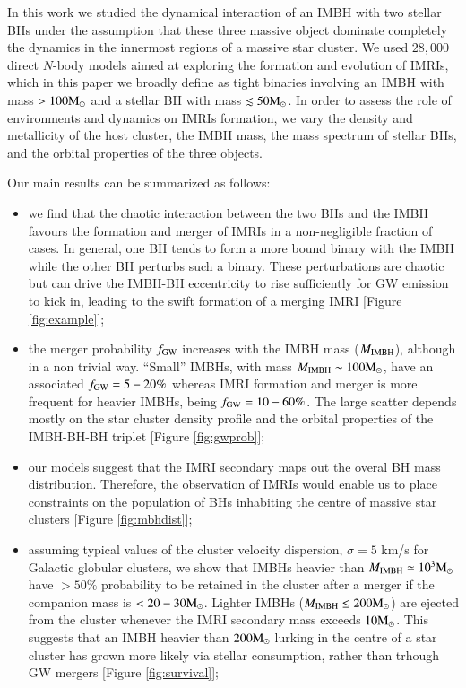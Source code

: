 \documentclass[article]{aa}
\newcommand{\Ms}{{\rm M}_\odot}
\newcommand{\gw}{{\rm GW}}
\newcommand{\ibh}{{\rm IMBH}}
\begin{document}
In this work we studied the dynamical interaction of an IMBH with two stellar BHs under the assumption
that these three massive object dominate completely the dynamics in the innermost regions of a massive star cluster.
We used $28,000$ direct $N$-body models aimed at exploring the formation and evolution of IMRIs, which in this paper we 
broadly define as tight binaries involving an IMBH with mass $> 100 \Ms$ and a stellar BH with mass $\lesssim 50 \Ms$.
In order to assess the role of environments and dynamics on IMRIs formation, we vary the density and metallicity of the 
host cluster, the IMBH mass, the mass spectrum of stellar BHs, and the orbital properties of the three objects. 

Our main results can be summarized as follows:
\begin{itemize}
\item we find that the chaotic interaction between the two BHs and the IMBH favours the formation and merger of IMRIs in a non-negligible fraction of cases. In general, one BH tends to form a more bound binary with the IMBH while the other BH perturbs such a binary. These perturbations are chaotic but can drive the IMBH-BH eccentricity to rise sufficiently for GW emission to kick in, leading to the swift formation
of a merging IMRI [Figure \ref{fig:example}];
\item the merger probability $f_\gw$ increases with the IMBH mass ($M_\ibh$), although in a non trivial way. ``Small'' IMBHs, with mass $M_\ibh \sim 100 \Ms$, have an associated $f_\gw = 5-20\%$ whereas IMRI formation and merger is more frequent for heavier IMBHs, being $f_\gw = 10-60\%$. The large scatter depends mostly on the star cluster density profile and the orbital properties of the IMBH-BH-BH triplet [Figure \ref{fig:gwprob}];
\item our models suggest that the IMRI secondary maps out the overal BH mass distribution. Therefore, the observation of IMRIs would enable us to place constraints on the population of BHs inhabiting the centre of massive star clusters [Figure \ref{fig:mbhdist}];
\item assuming typical values of the cluster velocity dispersion, $\sigma = 5$ km/s for Galactic globular clusters, we show that IMBHs heavier than $M_\ibh \simeq 10^3\Ms$ have $>50\%$ probability to be retained in the cluster after a merger if the companion mass is $<20-30 \Ms$. Lighter IMBHs ($M_\ibh \leq 200\Ms$) are ejected from the cluster whenever the IMRI secondary mass exceeds $10\Ms$. This suggests that an IMBH heavier than $200\Ms$ lurking in the centre of a star cluster has grown more likely via stellar consumption, rather than trhough GW mergers [Figure \ref{fig:survival}];

\end{itemize}
\end{document}
